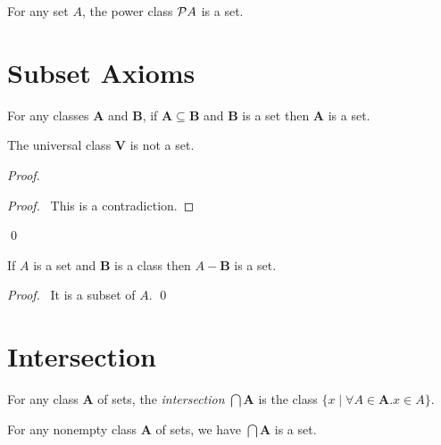 \begin{axiom}
    For any set $A$, the power class $\mathcal{P} A$ is a set.
\end{axiom}

\section{Subset Axioms}

\begin{axioms}
    For any classes $\mathbf{A}$ and $\mathbf{B}$,
    if $\mathbf{A} \subseteq \mathbf{B}$ and $\mathbf{B}$ is a set
    then $\mathbf{A}$ is a set.
\end{axioms}

\begin{theorem}[Subset]
    The universal class $\mathbf{V}$ is not a set.
\end{theorem}

\begin{proof}
    \pf
    \qedstep
    \begin{proof}
        \pf\ This is a contradiction.
    \end{proof}
    \qed
\end{proof}

\begin{theorem}[Subset]
    If $A$ is a set and $\mathbf{B}$ is a class then $A - \mathbf{B}$ is a set.
\end{theorem}

\begin{proof}
    \pf\ It is a subset of $A$. \qed
\end{proof}

\section{Intersection}

\begin{definition}[Intersection]
    For any class $\mathbf{A}$ of sets, the \emph{intersection}
    $\bigcap \mathbf{A}$ is the class $\{ x \mid \forall A \in \mathbf{A}. x \in A \}$.
\end{definition}

\begin{theorem}[Subset]
    For any nonempty class $\mathbf{A}$ of sets, we have $\bigcap \mathbf{A}$
    is a set.
\end{theorem}

